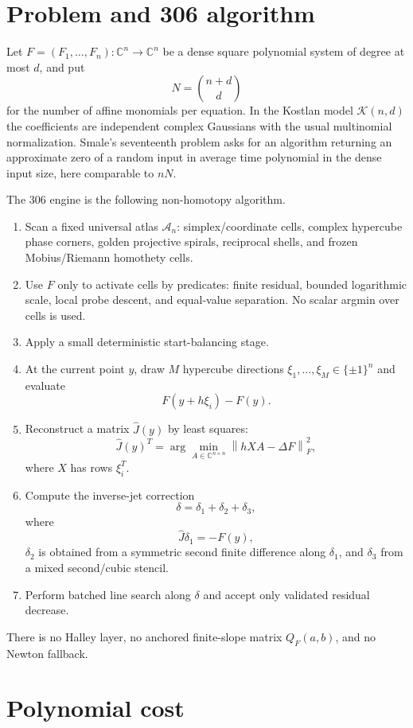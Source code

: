 \documentclass[11pt]{article}
\newcommand{\C}{\mathbb C}
\newcommand{\K}{\mathcal K}
\newcommand{\A}{\mathcal A}
\newcommand{\norm}[1]{\left\lVert #1\right\rVert}
\begin{document}
\section{Problem and 306 algorithm}

Let $F=(F_1,\ldots,F_n):\C^n\to\C^n$ be a dense square polynomial system of degree at most $d$, and put
\[
        N=\binom{n+d}{d}
\]
for the number of affine monomials per equation.  In the Kostlan model $\K(n,d)$ the coefficients are independent complex Gaussians with the usual multinomial normalization.  Smale's seventeenth problem asks for an algorithm returning an approximate zero of a random input in average time polynomial in the dense input size, here comparable to $nN$.

The 306 engine is the following non-homotopy algorithm.
\begin{enumerate}[label=(\roman*)]
\item Scan a fixed universal atlas $\A_n$: simplex/coordinate cells, complex hypercube phase corners, golden projective spirals, reciprocal shells, and frozen Mobius/Riemann homothety cells.
\item Use $F$ only to activate cells by predicates: finite residual, bounded logarithmic scale, local probe descent, and equal-value separation.  No scalar argmin over cells is used.
\item Apply a small deterministic start-balancing stage.
\item At the current point $y$, draw $M$ hypercube directions $\xi_1,\ldots,\xi_M\in\{\pm1\}^n$ and evaluate
\[
        F(y+h\xi_i)-F(y).
\]
\item Reconstruct a matrix $\widehat J(y)$ by least squares:
\[
        \widehat J(y)^T=\arg\min_{A\in\C^{n\times n}}\norm{hXA-\Delta F}_F^2,
\]
where $X$ has rows $\xi_i^T$.
\item Compute the inverse-jet correction
\[
        \delta=\delta_1+\delta_2+\delta_3,
\]
where
\[
        \widehat J\delta_1=-F(y),
\]
$\delta_2$ is obtained from a symmetric second finite difference along $\delta_1$, and $\delta_3$ from a mixed second/cubic stencil.
\item Perform batched line search along $\delta$ and accept only validated residual decrease.
\end{enumerate}
There is no Halley layer, no anchored finite-slope matrix $Q_F(a,b)$, and no Newton fallback.

\section{Polynomial cost}\label{sec:cost}
\end{document}
